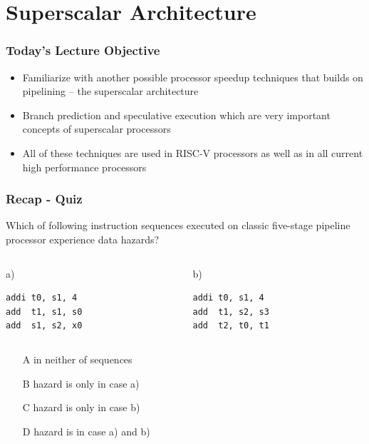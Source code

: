 \documentclass{beamer}
\subtitle{Lecture 06. Branches and Speculative Execution}
\author{Pavel Píša \phantom{xxxxxxx} Petr Štěpán \\ \small\texttt{pisa@fel.cvut.cz} \phantom{xx} \small\texttt{stepan@fel.cvut.cz} \\
\phantom{xxxxxxxxx} \\
License: CC-BY-SA}
\begin{document}
\maketitle

\section{Superscalar Architecture}

\begin{frame}
\frametitle{Today's Lecture Objective}

\begin{itemize}
 \item Familiarize with another possible processor speedup techniques that builds on pipelining -- the superscalar architecture
 \item Branch prediction and speculative execution which are very important concepts of superscalar processors
 \item All of these techniques are used in RISC-V processors as well as in all current high performance processors
\end{itemize}

\end{frame}

\begin{frame}[fragile]
\frametitle{Recap - Quiz}

Which of following instruction sequences executed on classic five-stage pipeline processor experience data hazards?

\begin{columns}[T]
\begin{column}{0.40\textwidth}
\phantom{xxxxx}a)

\begin{verbatim}
addi t0, s1, 4
add  t1, s1, s0
add  s1, s2, x0
\end{verbatim}
\end{column}
\begin{column}{0.40\textwidth}
\phantom{xxxxx}b)

\begin{verbatim}
addi t0, s1, 4
add  t1, s2, s3
add  t2, t0, t1
\end{verbatim}
\end{column}
\end{columns}
\bigskip
\begin{itemize}
 \item[A] in neither of sequences
 \item[B] hazard is only in case a)
 \item[C] hazard is only in case b)
 \item[D] hazard is in case a) and b)
\end{itemize}

\end{frame}
\end{document}
